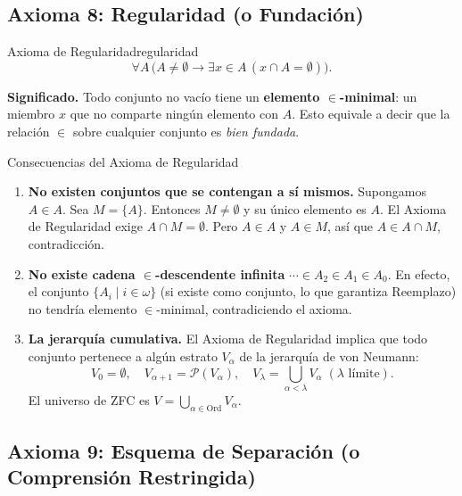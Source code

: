 \subsection{Axioma 8: Regularidad (o Fundación)}

\begin{definicion}{Axioma de Regularidad}{regularidad}
\[
  \forall A\,\bigl(A \neq \emptyset \to \exists x \in A\,(x \cap A = \emptyset)\bigr).
\]
\end{definicion}

\textbf{Significado.} Todo conjunto no vacío tiene un \textbf{elemento $\in$-minimal}: un miembro $x$ que no comparte ningún elemento con $A$. Esto equivale a decir que la relación $\in$ sobre cualquier conjunto es \emph{bien fundada}.

\begin{ejemplo}{Consecuencias del Axioma de Regularidad}{}
\begin{enumerate}[leftmargin=2em, label=(\alph*)]
  \item \textbf{No existen conjuntos que se contengan a sí mismos.}
    Supongamos $A \in A$. Sea $M = \{A\}$. Entonces $M \neq \emptyset$ y su único elemento es $A$. El Axioma de Regularidad exige $A \cap M = \emptyset$. Pero $A \in A$ y $A \in M$, así que $A \in A \cap M$, contradicción.

  \item \textbf{No existe cadena $\in$-descendente infinita} $\cdots \in A_2 \in A_1 \in A_0$.
    En efecto, el conjunto $\{A_i \mid i \in \omega\}$ (si existe como conjunto, lo que garantiza Reemplazo) no tendría elemento $\in$-minimal, contradiciendo el axioma.

  \item \textbf{La jerarquía cumulativa.} El Axioma de Regularidad implica que todo conjunto pertenece a algún estrato $V_\alpha$ de la jerarquía de von Neumann:
    \[
      V_0 = \emptyset, \quad V_{\alpha+1} = \mathcal{P}(V_\alpha), \quad V_\lambda = \bigcup_{\alpha < \lambda} V_\alpha \;(\lambda \text{ límite}).
    \]
    El universo de ZFC es $V = \bigcup_{\alpha \in \mathrm{Ord}} V_\alpha$.
\end{enumerate}
\end{ejemplo}

\subsection{Axioma 9: Esquema de Separación (o Comprensión Restringida)}

